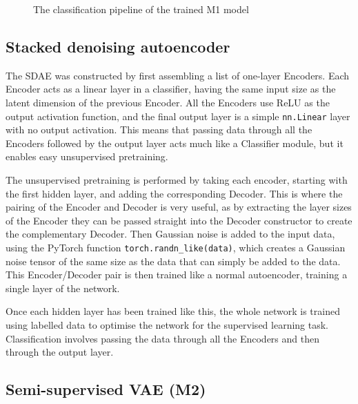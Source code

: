 \begin{figure}[H]
  \centering
  \caption{The classification pipeline of the trained M1 model}
\end{figure}

\subsection{Stacked denoising autoencoder}
The SDAE was constructed by first assembling a list of one-layer Encoders. Each Encoder acts as a linear layer in a classifier,
having the same input size as the latent dimension of the 
previous Encoder. All the Encoders use ReLU as the output activation function, and the final output layer is a simple \texttt{nn.Linear} layer with 
no output activation. This means that passing data through all the Encoders followed by the output layer acts much like 
a Classifier module, but it enables easy unsupervised pretraining.

The unsupervised pretraining is performed by taking each encoder, starting with the first hidden layer, and adding the corresponding 
Decoder. This is where the pairing of the Encoder and Decoder is very useful, as by extracting the layer sizes of the Encoder they 
can be passed straight into the Decoder constructor to create the complementary Decoder. Then Gaussian noise is added to the input data,
using the PyTorch function \texttt{torch.randn\_like(data)}, which creates a Gaussian noise tensor of the same size as the data that can
simply be added to the data. This Encoder/Decoder pair is then trained like a normal autoencoder, training a single layer of the network.

Once each hidden layer has been trained like this, the whole network is trained using labelled data to optimise the network for the 
supervised learning task. Classification involves passing the data through all the Encoders and then through 
the output layer.

\subsection{Semi-supervised VAE (M2)}

